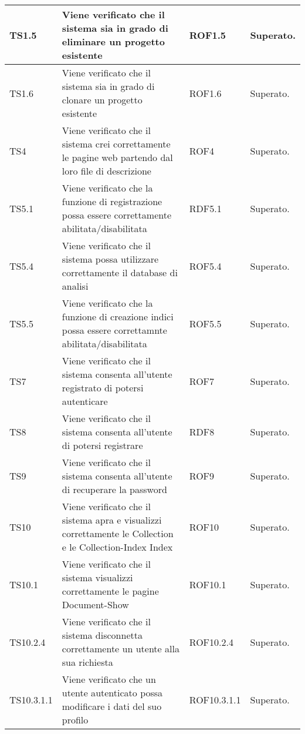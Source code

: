 \begin{center}
\begin{longtable}{|p{2cm}|p{7cm}|p{2cm}|p{2cm}|}
\midrule
TS1.5
& Viene verificato che il sistema sia in grado di eliminare un progetto esistente
& ROF1.5
& Superato.\\


\midrule
TS1.6
& Viene verificato che il sistema sia in grado di clonare un progetto esistente
& ROF1.6
& Superato.\\


\midrule
TS4
& Viene verificato che il sistema crei correttamente le pagine web partendo dal loro file di descrizione
& ROF4
& Superato.\\


\midrule
TS5.1
& Viene verificato che la funzione di registrazione possa essere correttamente abilitata/disabilitata
& RDF5.1
& Superato.\\


\midrule
TS5.4
& Viene verificato che il sistema possa utilizzare correttamente il database di analisi
& ROF5.4
& Superato.\\


\midrule
TS5.5
& Viene verificato che la funzione di creazione indici possa essere correttamnte abilitata/disabilitata
& ROF5.5
& Superato.\\


\midrule
TS7
& Viene verificato che il sistema consenta all'utente registrato di potersi autenticare
& ROF7
& Superato.\\


\midrule
TS8
& Viene verificato che il sistema consenta all'utente di potersi registrare
& RDF8
& Superato.\\


\midrule
TS9
& Viene verificato che il sistema consenta all'utente di recuperare la password
& ROF9
& Superato.\\


\midrule
TS10
& Viene verificato che il sistema apra e visualizzi correttamente le Collection e le Collection-Index
Index
& ROF10
& Superato.\\


\midrule
TS10.1
& Viene verificato che il sistema visualizzi correttamente le pagine Document-Show
& ROF10.1
& Superato.\\


\midrule
TS10.2.4
& Viene verificato che il sistema disconnetta correttamente un utente alla sua richiesta
& ROF10.2.4
& Superato.\\


\midrule
TS10.3.1.1
& Viene verificato che un utente autenticato possa modificare i dati del suo profilo
& ROF10.3.1.1
& Superato.\\



\end{longtable}
\end{center}
